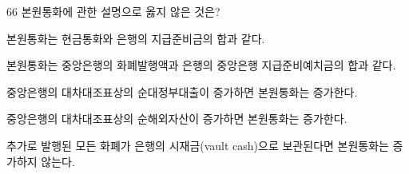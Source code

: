 \begin{question}{66}
본원통화에 관한 설명으로 옳지 않은 것은?
\begin{choices}
  \item 본원통화는 현금통화와 은행의 지급준비금의 합과 같다.
  \item 본원통화는 중앙은행의 화폐발행액과 은행의 중앙은행 지급준비예치금의 합과 같다.
  \item 중앙은행의 대차대조표상의 순대정부대출이 증가하면 본원통화는 증가한다.
  \item 중앙은행의 대차대조표상의 순해외자산이 증가하면 본원통화는 증가한다.
  \item 추가로 발행된 모든 화폐가 은행의 시재금(vault cash)으로 보관된다면 본원통화는 증가하지 않는다.
\end{choices}
\end{question}
